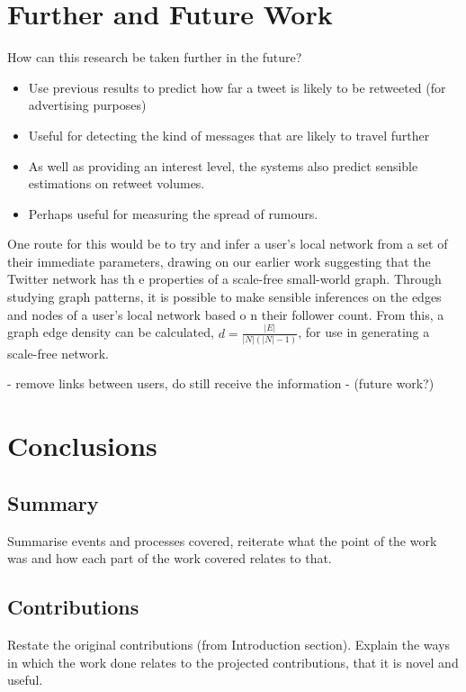 \section{Further and Future Work}
How can this research be taken further in the future?

\begin{itemize}
\item Use previous results to predict how far a tweet is likely to be retweeted (for advertising purposes)
\item Useful for detecting the kind of messages that are likely to travel further
\item As well as providing an interest level, the systems also predict sensible estimations on retweet volumes.
\item Perhaps useful for measuring the spread of rumours.
\end{itemize}

One route for this would be to try and infer a user's local network from a set of their immediate parameters, drawing on our earlier work suggesting that the Twitter network has th    e properties of a scale-free small-world graph. Through studying graph patterns, it is possible to make sensible inferences on the edges and nodes of a user's local network based o    n their follower count. From this, a graph edge density can be calculated, $ d = \frac{|E|}{|N|(|N|-1)} $, for use in generating a scale-free network.

- remove links between users, do still receive the information - (future work?)


\section{Conclusions}
\subsection{Summary}
Summarise events and processes covered, reiterate what the point of the work was and how each part of the work covered relates to that.

\subsection{Contributions}
Restate the original contributions (from Introduction section). Explain the ways in which the work done relates to the projected contributions, that it is novel and useful.
